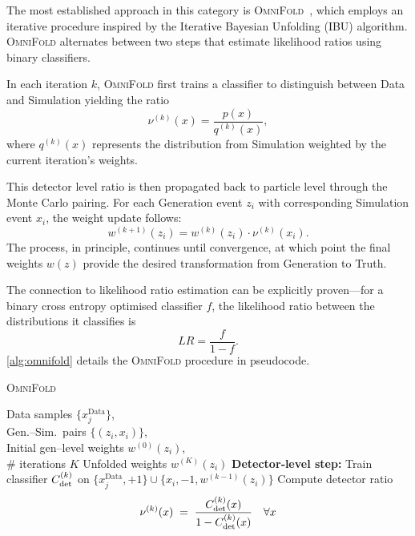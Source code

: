             The most established approach in this category is \textsc{OmniFold}~\cite{andreassen_omnifold_2020}, which employs an iterative procedure inspired by the Iterative Bayesian Unfolding (IBU) algorithm.
            \textsc{OmniFold} alternates between two steps that estimate likelihood ratios using binary classifiers.
            
            In each iteration \(k\), \textsc{OmniFold} first trains a classifier to distinguish between Data and Simulation yielding the ratio
            \begin{equation}
                \nu^{(k)}(x) = \frac{p(x)}{q^{(k)}(x)},
            \end{equation}
            where \(q^{(k)}(x)\) represents the distribution from Simulation weighted by the current iteration's weights.

            This detector level ratio is then propagated back to particle level through the Monte Carlo pairing.
            For each Generation event \(z_i\) with corresponding Simulation event \(x_i\), the weight update follows:
            \begin{equation}
                w^{(k+1)}(z_i) = w^{(k)}(z_i) \cdot \nu^{(k)}(x_i).
            \end{equation}
            The process, in principle, continues until convergence, at which point the final weights \(w(z)\) provide the desired transformation from Generation to Truth.
            
            The connection to likelihood ratio estimation can be explicitly proven---for a binary cross entropy optimised classifier \(f\), the likelihood ratio between the distributions it classifies is
            \[
                LR = \frac{f}{1-f}.
            \]
            \cref{alg:omnifold} details the \textsc{OmniFold} procedure in pseudocode.


\begin{algorithm}
  \caption{\textsc{OmniFold}}
  \label{alg:omnifold}
  \begin{algorithmic}[1]
    \Require 
      Data samples $\{x_j^{\mathrm{Data}}\}$,\\
      Gen.\!--Sim.\ pairs $\{(z_i,x_i)\}$,\\
      Initial gen–level weights $w^{(0)}(z_i)$,\\
      \# iterations $K$
    \Ensure 
      Unfolded weights $w^{(K)}(z_i)$
      \State \textbf{Detector‐level step:}
      \State Train classifier $C_{\rm det}^{(k)}$ on
        $\{x_j^{\mathrm{Data}},+1\}\cup\{x_i,-1,w^{(k-1)}(z_i)\}$
      \State Compute detector ratio
        \[
          \nu^{(k)}(x)\;=\;\frac{C_{\rm det}^{(k)}(x)}{1 - C_{\rm det}^{(k)}(x)}
          \quad\forall x
        \]
    \end{algorithmic}
\end{algorithm}

